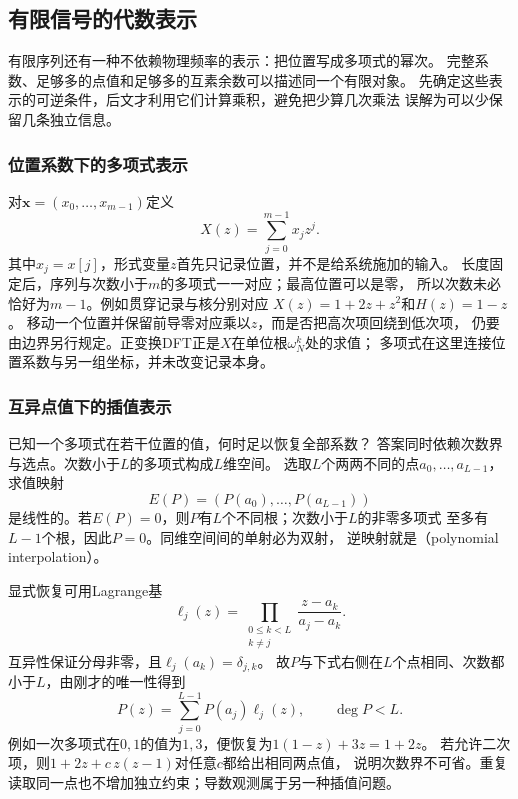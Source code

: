 \subsection{有限信号的代数表示}
\label{sec:signal-analysis-polynomial-arithmetic}

有限序列还有一种不依赖物理频率的表示：把位置写成多项式的幂次。
完整系数、足够多的点值和足够多的互素余数可以描述同一个有限对象。
先确定这些表示的可逆条件，后文才利用它们计算乘积，避免把少算几次乘法
误解为可以少保留几条独立信息。

\subsubsection{位置系数下的多项式表示}

对$\bm x=(x_0,\ldots,x_{m-1})$定义
\[
  X(z)=\sum_{j=0}^{m-1}x_jz^j.
\]
其中$x_j=x[j]$，形式变量$z$首先只记录位置，并不是给系统施加的输入。
长度固定后，序列与次数小于$m$的多项式一一对应；最高位置可以是零，
所以次数未必恰好为$m-1$。例如贯穿记录与核分别对应
$X(z)=1+2z+z^2$和$H(z)=1-z$。
移动一个位置并保留前导零对应乘以$z$，而是否把高次项回绕到低次项，
仍要由边界另行规定。正变换DFT正是$X$在单位根$\omega_N^k$处的求值；
多项式在这里连接位置系数与另一组坐标，并未改变记录本身。

\subsubsection{互异点值下的插值表示}

已知一个多项式在若干位置的值，何时足以恢复全部系数？
答案同时依赖次数界与选点。次数小于$L$的多项式构成$L$维空间。
选取$L$个两两不同的点$a_0,\ldots,a_{L-1}$，求值映射
\[
  E(P)=(P(a_0),\ldots,P(a_{L-1}))
\]
是线性的。若$E(P)=0$，则$P$有$L$个不同根；次数小于$L$的非零多项式
至多有$L-1$个根，因此$P=0$。同维空间间的单射必为双射，
逆映射就是（polynomial interpolation）。

显式恢复可用Lagrange基
\[
  \ell_j(z)=\prod_{\substack{0\leq k<L\\k\neq j}}
  \frac{z-a_k}{a_j-a_k}.
\]
互异性保证分母非零，且$\ell_j(a_k)=\delta_{j,k}$。
故$P$与下式右侧在$L$个点相同、次数都小于$L$，由刚才的唯一性得到
\begin{equation}
  P(z)=\sum_{j=0}^{L-1}P(a_j)\ell_j(z),\qquad\deg P<L.
  \label{eq:signal-analysis-lagrange-interpolation}
\end{equation}
例如一次多项式在$0,1$的值为$1,3$，便恢复为$1(1-z)+3z=1+2z$。
若允许二次项，则$1+2z+c\,z(z-1)$对任意$c$都给出相同两点值，
说明次数界不可省。重复读取同一点也不增加独立约束；导数观测属于另一种插值问题。

